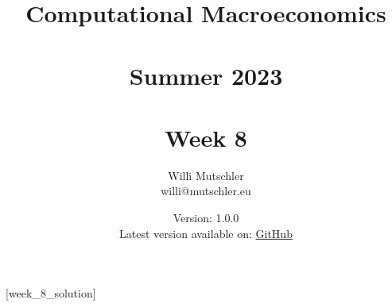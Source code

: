 
\newif\ifDisplaySolutions%


\title{Computational Macroeconomics\\~\\Summer 2023\\~\\Week 8}
\author{Willi Mutschler\\willi@mutschler.eu}
\date{Version: 1.0.0\\Latest version available on: \href{https://github.com/wmutschl/Computational-Macroeconomics/releases/latest/download/week_8.pdf}{GitHub}}
\maketitle\thispagestyle{empty}

\newpage
{}[week_8_solution]
\tableofcontents\thispagestyle{empty}\newpage

\setcounter{page}{1}
\newpage
\newpage
\newpage
\newpage

\printbibliography
\newpage

\ifDisplaySolutions 
\newpage
\appendix
\section{Solutions}

\fi
